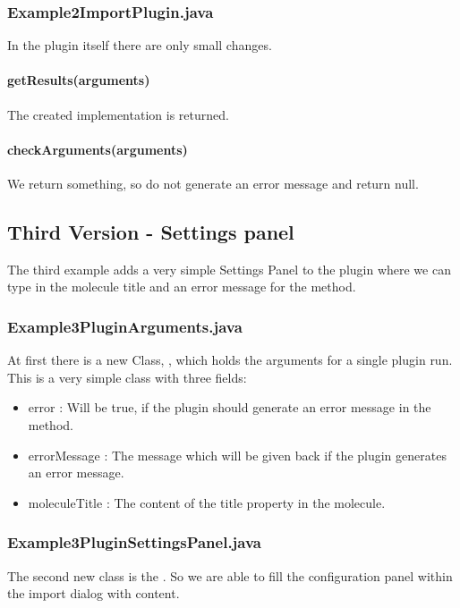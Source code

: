 \subsubsection{Example2ImportPlugin.java}
In the plugin itself there are only small changes.

\paragraph{getResults(arguments)}
The created  implementation is returned.

\paragraph{checkArguments(arguments)}
We return something, so do not generate an error message and return null.


\subsection{Third Version - Settings panel}
The third example adds a very simple Settings Panel to the plugin where we can type in the molecule title and an error message for the  method.

\subsubsection{Example3PluginArguments.java}
At first there is a new Class, , which holds the arguments for a single plugin run. This is a very simple class with three fields:
\begin{itemize}
  \item {} error : Will be true, if the plugin should generate an error message in the  method.
  \item {} errorMessage : The message which will be given back if the plugin generates an error message.
  \item {} moleculeTitle : The content of the title property in the molecule.
\end{itemize}

\subsubsection{Example3PluginSettingsPanel.java}
The second new class is the . So we are able to fill the configuration panel within the import dialog with content.

